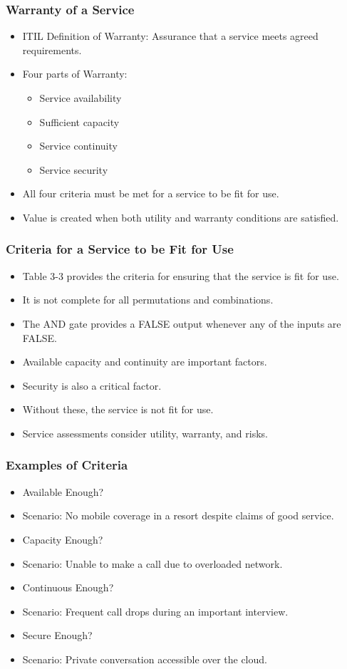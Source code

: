\documentclass[aspectratio=169, table]{beamer}
\begin{document}
\begin{frame}
	\frametitle{Warranty of a Service}
	\begin{itemize}
		\item ITIL Definition of Warranty: Assurance that a service meets agreed requirements.
		\item Four parts of Warranty:
		\begin{itemize}
			\item Service availability
			\item Sufficient capacity
			\item Service continuity
			\item Service security
		\end{itemize}
		\item All four criteria must be met for a service to be fit for use.
		\item Value is created when both utility and warranty conditions are satisfied.
	\end{itemize}
\end{frame}

\begin{frame}
	\frametitle{Criteria for a Service to be Fit for Use}
	\begin{itemize}
		\item Table 3-3 provides the criteria for ensuring that the service is fit for use.
		\item It is not complete for all permutations and combinations.
		\item The AND gate provides a FALSE output whenever any of the inputs are FALSE.
		\item Available capacity and continuity are important factors.
		\item Security is also a critical factor.
		\item Without these, the service is not fit for use.
		\item Service assessments consider utility, warranty, and risks.
	\end{itemize}
\end{frame}

\begin{frame}
	\frametitle{Examples of Criteria}
	\begin{itemize}
		\item Available Enough? 
		\item Scenario: No mobile coverage in a resort despite claims of good service.
		\item Capacity Enough? 
		\item Scenario: Unable to make a call due to overloaded network.
		\item Continuous Enough? 
		\item Scenario: Frequent call drops during an important interview.
		\item Secure Enough? 
		\item Scenario: Private conversation accessible over the cloud.
	\end{itemize}
\end{frame}
\end{document}
